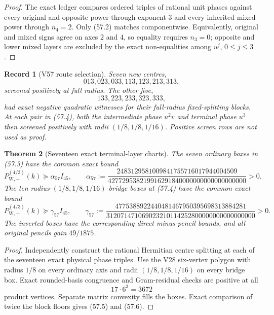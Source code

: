 \documentclass[11pt,oneside]{article}
\newtheorem{theorem}{Theorem}[section]
\newtheorem{record}[theorem]{Record}
\theoremstyle{definition}
\theoremstyle{remark}
\begin{document}
\begin{proof}
The exact ledger compares ordered triples of rational unit phases
against every original and opposite power through exponent \(3\)
and every inherited mixed power through \(n_4=2\).  Only (57.2)
matches componentwise.  Equivalently, original and mixed signs
agree on axes \(2\) and \(4\), so equality requires \(n_3=0\);
opposite and lower mixed layers are excluded by the exact
non-equalities among \(u^j\), \(0\le j\le3\).
\end{proof}

\begin{record}[V57 route selection]
\label{rec:newv57-screens}
Seven new centres,
\[
 013,023,033,113,123,213,313,                         \tag{57.3}
\]
screened positively at full radius.  The other five,
\[
 133,223,233,323,333,                                 \tag{57.4}
\]
had exact negative quadratic witnesses for their full-radius
fixed-splitting blocks.  At each pair in (57.4), both the
intermediate phase \(u^2v\) and terminal phase \(u^3\) then screened
positively with radii \((1/8,1/8,1/16)\).  Positive screen rows are
not used as proof.
\end{record}

\begin{theorem}[Seventeen exact terminal-layer charts]
\label{thm:newv57-seventeen-charts}
The seven ordinary boxes in (57.3) have the common exact bound
\[
 P_{\mathrm W,+}^{(4/3)}(k)
 \succeq\alpha_{57}I_{45},\qquad
 \alpha_{57}:=
 \frac{2483129581009841755716017944004509}
 {427729538219916291840000000000000000000}>0.          \tag{57.5}
\]
The ten radius-\((1/8,1/8,1/16)\) bridge boxes at (57.4) have the
common exact bound
\[
 P_{\mathrm W,+}^{(4/3)}(k)
 \succeq\gamma_{57}I_{45},\qquad
 \gamma_{57}:=
 \frac{4775388922440481467950395698313884281}
 {312071471069023210114252800000000000000000}>0.       \tag{57.6}
\]
The inverted boxes have the corresponding direct minus-pencil
bounds, and all original pencils gain \(49/1875\).
\end{theorem}

\begin{proof}
Independently construct the rational Hermitian centre splitting at
each of the seventeen exact physical phase triples.  Use the V28
six-vertex polygon with radius \(1/8\) on every ordinary axis and
radii \((1/8,1/8,1/16)\) on every bridge box.  Exact rounded-basis
congruence and Gram-residual checks are positive at all
\[
 17\cdot6^3=3672                                      \tag{57.7}
\]
product vertices.  Separate matrix convexity fills the boxes.
Exact comparison of twice the block floors gives (57.5) and
(57.6).
\end{proof}
\end{document}
